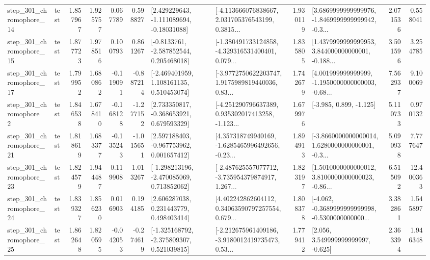 \begin{tabular}{llrrrrllrlrr}
  step\_301\_chromophore\_14 &      test &      1.857967 &    1.925757 &      0.067789 &  0.598827 &    [2.429229643, -1.111089694, -0.18031088] &  [-4.113666076838667, 2.031705376543199, 0.3815... &       1.930119 &  [3.6869999999999976, -1.8469999999999942, -0.3... &            2.071536 &          0.558041 \\
  step\_301\_chromophore\_15 &      test &      1.877723 &    1.978516 &      0.100793 &  0.861267 &     [-0.8133761, -2.587852544, 0.205468018] &  [-1.380491733124858, -4.329316531400401, 0.079... &       1.835805 &  [1.4379999999999953, 3.844000000000001, -0.188... &            3.501596 &          3.254785 \\
  step\_301\_chromophore\_17 &      test &      1.799952 &    1.680862 &     -0.119091 & -0.887214 &    [-2.469401959, 1.108161135, 0.510453074] &  [-3.9772750622203747, 1.9175989819440036, 0.83... &       1.742679 &  [4.001999999999999, -1.1950000000000003, -0.68... &            7.562937 &          9.100069 \\
   step\_301\_chromophore\_2 &      test &      1.846538 &    1.678410 &     -0.168128 & -1.277152 &    [2.733350817, -0.368653921, 0.679593329] &  [-4.251290796637389, 0.935302017413258, -1.123... &       1.679976 &                            [-3.985, 0.899, -1.125] &            5.110733 &          0.970132 \\
  step\_301\_chromophore\_21 &      test &      1.818619 &    1.683377 &     -0.135243 & -1.015651 &    [2.597188403, -0.967753962, 0.001657412] &  [4.357318749940169, -1.6285465996492656, -0.23... &       1.894913 &  [-3.8660000000000014, 1.6280000000000001, -0.3... &            5.090938 &          7.777647 \\
  step\_301\_chromophore\_23 &      test &      1.824579 &    1.944487 &      0.119908 &  1.013267 &   [-1.298213196, -2.470085069, 0.713852062] &  [-2.487625557077712, -3.735954379874917, 1.267... &       1.823197 &  [1.5010000000000012, 3.8100000000000023, -0.86... &            6.515092 &         12.400363 \\
  step\_301\_chromophore\_24 &      test &      1.839327 &    1.856230 &      0.016903 &  0.194185 &     [2.606287038, 0.231443779, 0.498403414] &  [4.402242862604112, 0.34063590797257554, 0.679... &       1.808378 &  [-4.062, -0.3689999999999998, -0.5300000000000... &            3.382861 &          1.545897 \\
  step\_301\_chromophore\_25 &      test &      1.862648 &    1.820595 &     -0.042053 & -0.274619 &   [-1.325168792, -2.375809307, 0.521039815] &  [-2.212675961409186, -3.9180012419735473, 0.53... &       1.779412 &                 [2.056, 3.549999999999997, -0.625] &            2.363394 &          1.946348 \\

\end{tabular}

